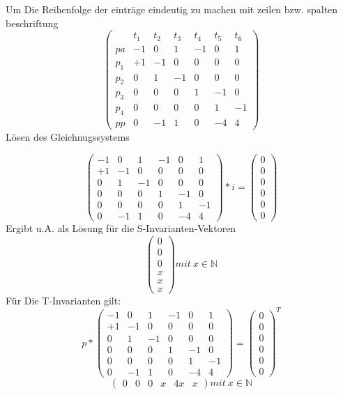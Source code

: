 Um Die Reihenfolge der einträge eindeutig zu machen mit zeilen bzw. spalten beschriftung
\[
\begin{pmatrix}
&t_1&t_2&t_3&t_4&t_5&t_6\\
pa&-1&0&1&-1&0&1  \\
p_1&+1&-1&0&0&0&0  \\
p_2&0&1&-1&0&0&0  \\
p_3&0&0&0&1&-1&0  \\
p_4&0&0&0&0&1&-1  \\
pp&0&-1&1&0&-4&4
\end{pmatrix}
\]
Lösen des Gleichnugssystems

\[
\begin{pmatrix}
-1&0&1&-1&0&1  \\
+1&-1&0&0&0&0  \\
0&1&-1&0&0&0  \\
0&0&0&1&-1&0  \\
0&0&0&0&1&-1  \\
0&-1&1&0&-4&4
\end{pmatrix}
*i=\begin{pmatrix}
0\\0\\0\\0\\0\\0
\end{pmatrix}
\]
Ergibt u.A. als Lösung für die S-Invarianten-Vektoren 
\[\begin{pmatrix}
0\\0\\0\\x\\x\\x
\end{pmatrix}mit\ x\in \mathbb{N}\]
Für Die T-Invarianten gilt:
\[
p*
\begin{pmatrix}
-1&0&1&-1&0&1  \\
+1&-1&0&0&0&0  \\
0&1&-1&0&0&0  \\
0&0&0&1&-1&0  \\
0&0&0&0&1&-1  \\
0&-1&1&0&-4&4
\end{pmatrix}
=\begin{pmatrix}
0\\0\\0\\0\\0\\0
\end{pmatrix}^T
\]
\[
\begin{pmatrix}
0&0&0&x&4x&x
\end{pmatrix} mit\ x\in \mathbb{N}\]